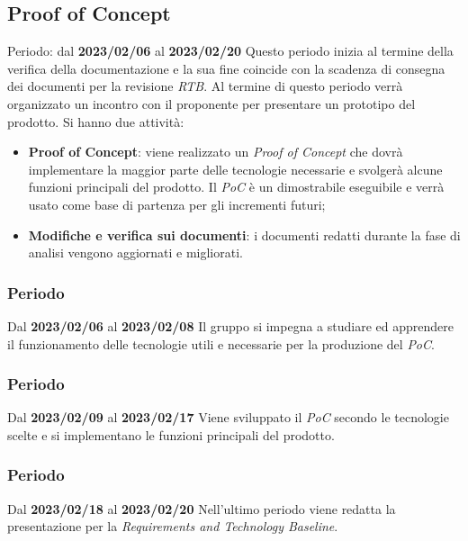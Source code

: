 \subsection{Proof of Concept}
Periodo: dal \textbf{2023/02/06} al \textbf{2023/02/20} \newline
Questo periodo inizia al termine della verifica della documentazione e la sua fine coincide con la scadenza
di consegna dei documenti per la revisione \textit{RTB}\glo.
Al termine di questo periodo verrà organizzato un incontro con il proponente per presentare un prototipo del prodotto.\newline
Si hanno due attività:
\begin{itemize}
    \item \textbf{Proof of Concept}: viene realizzato un \textit{Proof of Concept} che dovrà implementare la maggior
          parte delle tecnologie necessarie e svolgerà alcune funzioni principali del prodotto. Il \textit{PoC} è un dimostrabile eseguibile
          e verrà usato come base di partenza per gli incrementi futuri;
    \item \textbf{Modifiche e verifica sui documenti}: i documenti redatti durante la fase di analisi vengono aggiornati e migliorati.
\end{itemize}
\subsubsection{ Periodo}
Dal \textbf{2023/02/06} al \textbf{2023/02/08}
\newline
Il gruppo si impegna a studiare ed apprendere il funzionamento delle tecnologie utili e necessarie per la produzione del \textit{PoC}.

\subsubsection{ Periodo}
Dal \textbf{2023/02/09} al \textbf{2023/02/17}
\newline
Viene sviluppato il \textit{PoC} secondo le tecnologie scelte e si implementano le funzioni principali del prodotto.

\subsubsection{ Periodo}
Dal \textbf{2023/02/18} al \textbf{2023/02/20}
\newline
Nell'ultimo periodo viene redatta la presentazione per la \textit{Requirements and Technology Baseline}.

